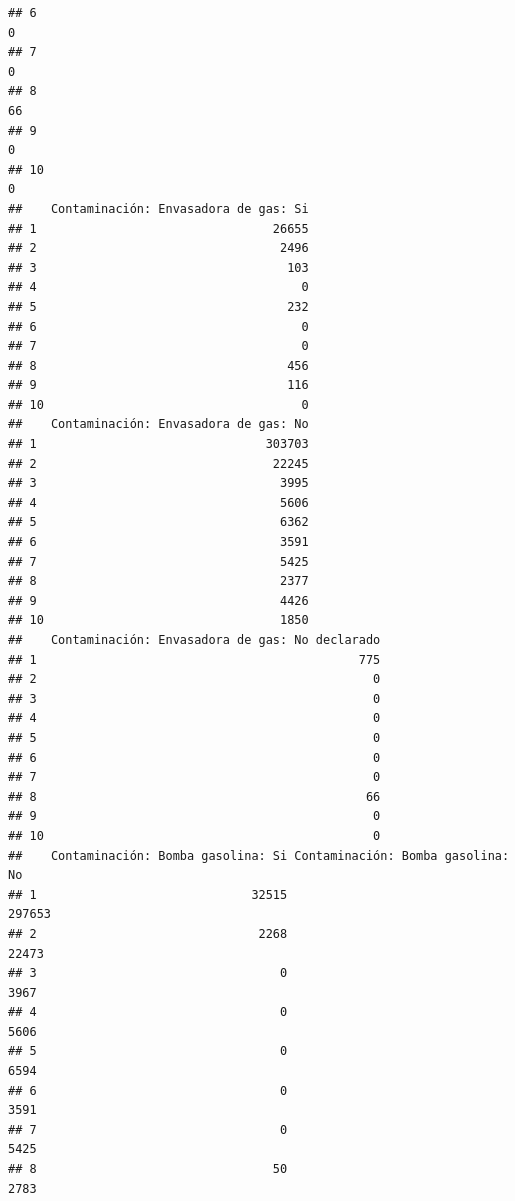 \documentclass[11pt,]{article}
\begin{document}
\begin{verbatim}
## 6                                                                              0
## 7                                                                              0
## 8                                                                             66
## 9                                                                              0
## 10                                                                             0
##    Contaminación: Envasadora de gas: Si
## 1                                 26655
## 2                                  2496
## 3                                   103
## 4                                     0
## 5                                   232
## 6                                     0
## 7                                     0
## 8                                   456
## 9                                   116
## 10                                    0
##    Contaminación: Envasadora de gas: No
## 1                                303703
## 2                                 22245
## 3                                  3995
## 4                                  5606
## 5                                  6362
## 6                                  3591
## 7                                  5425
## 8                                  2377
## 9                                  4426
## 10                                 1850
##    Contaminación: Envasadora de gas: No declarado
## 1                                             775
## 2                                               0
## 3                                               0
## 4                                               0
## 5                                               0
## 6                                               0
## 7                                               0
## 8                                              66
## 9                                               0
## 10                                              0
##    Contaminación: Bomba gasolina: Si Contaminación: Bomba gasolina: No
## 1                              32515                            297653
## 2                               2268                             22473
## 3                                  0                              3967
## 4                                  0                              5606
## 5                                  0                              6594
## 6                                  0                              3591
## 7                                  0                              5425
## 8                                 50                              2783

\end{verbatim}
\end{document}
